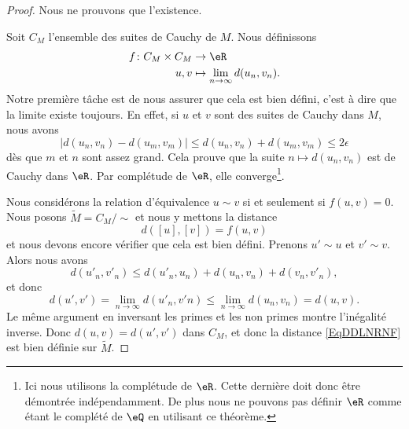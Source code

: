 \begin{proof}
    Nous ne prouvons que l'existence.

    Soit \( C_M\) l'ensemble des suites de Cauchy de \( M\). Nous définissons
    \begin{equation}
        \begin{aligned}
            f\colon C_M\times C_M&\to \eR \\
            u,v&\mapsto \lim_{n\to \infty} d(u_n,v_n).
        \end{aligned}
    \end{equation}
    Notre première tâche est de nous assurer que cela est bien défini, c'est à dire que la limite existe toujours. En effet, si \( u\) et \( v\) sont des suites de Cauchy dans \( M\), nous avons
    \begin{equation}
        \left| d(u_n,v_n)-d(u_m,v_m) \right| \leq d(u_n,v_n)+d(u_m,v_m)\leq 2\epsilon
    \end{equation}
    dès que \( m\) et \( n\) sont assez grand. Cela prouve que la suite \( n\mapsto d(u_n,v_n)\) est de Cauchy dans \( \eR\). Par complétude de \( \eR\), elle converge\footnote{Ici nous utilisons la complétude de \( \eR\). Cette dernière doit donc être démontrée indépendamment. De plus nous ne pouvons pas définir \( \eR\) comme étant le complété de \( \eQ\) en utilisant ce théorème.}. 
    
    Nous considérons la relation d'équivalence \( u\sim v\) si et seulement si \( f(u,v)=0\). Nous posons \( \tilde M=C_M/\sim\) et nous y mettons la distance
    \begin{equation}    \label{EqDDLNRNF}
        d( [u],[v]  )=f(u,v)
    \end{equation}
    et nous devons encore vérifier que cela est bien défini. Prenons \( u'\sim u\) et \( v'\sim v\). Alors nous avons
    \begin{equation}
        d(u'_n,v'_n)\leq d(u'_n,u_n)+d(u_n,v_n)+d(v_n,v'_n),
    \end{equation}
    et donc 
    \begin{equation}
        d(u',v')=\lim_{n\to \infty} d(u'_n,v'n)\leq \lim_{n\to \infty} d(u_n,v_n)=d(u,v).
    \end{equation}
    Le même argument en inversant les primes et les non primes montre l'inégalité inverse. Donc \( d(u,v)=d(u',v')\) dans \( C_M\), et donc la distance \eqref{EqDDLNRNF} est bien définie sur \( \tilde M\).


\end{proof}
